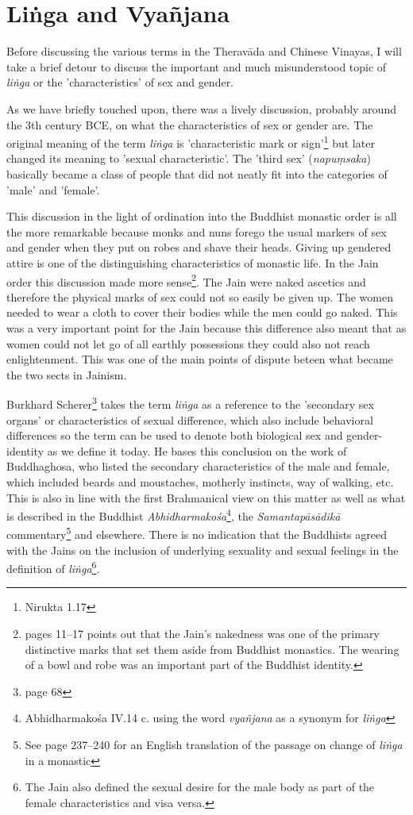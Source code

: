 \section{Liṅga and Vyañjana}
\label{linga}

Before discussing the various terms in the Theravāda and Chinese Vinayas, I will take a brief detour to discuss the important and much misunderstood topic of {\em liṅga} or the 'characteristics' of sex and gender.

As we have briefly touched upon, there was a lively discussion, probably around the 3th century BCE, on what the characteristics of sex or gender are. The original meaning of the term {\em liṅga} is 'characteristic mark or sign'\footnote{Nirukta 1.17} but later changed its meaning to 'sexual characteristic'. The 'third sex' ({\em napuṃsaka}) basically became a class of people that did not neatly fit into the categories of 'male' and 'female'. 

This discussion in the light of ordination into the Buddhist monastic order is all the more remarkable because monks and nuns forego the usual markers of sex and gender when they put on robes and shave their heads. Giving up gendered attire is one of the distinguishing characteristics of monastic life. In the Jain order this discussion made more sense\footnote{\cite{maes2016} pages 11–17 points out that the Jain's nakedness was one of the primary distinctive marks that set them aside from Buddhist monastics. The wearing of a bowl and robe was an important part of the Buddhist identity.}. The Jain were naked ascetics and therefore the physical marks of sex could not so easily be given up. The women needed to wear a cloth to cover their bodies while the men could go naked. This was a very important point for the Jain because this difference also meant that as women could not let go of all earthly possessions they could also not reach enlightenment. This was one of the main points of dispute beteen what became the two sects in Jainism.

Burkhard Scherer\footnote{\cite{scherer} page 68} takes the term {\em liṅga} as a reference to the 'secondary sex organs' or characteristics of sexual difference, which also include behavioral differences so the term can be used to denote both biological sex and gender-identity as we define it today. He bases this conclusion on the work of Buddhaghosa, who listed the secondary characteristics of the male and female, which included beards and moustaches, motherly instincts, way of walking, etc. This is also in line with the first Brahmanical view on this matter as well as what is described in the Buddhist {\em Abhidharmakośa}\footnote{Abhidharmakośa IV.14 c. using the word {\em vyañjana} as a synonym for {\em liṅga}}, the {\em Samantapāsādikā} commentary\footnote{See \cite{anderson2016} page 237–240 for an English translation of the passage on change of {\em liṅga} in a monastic} and elsewhere. There is no indication that the Buddhists agreed with the Jains on the inclusion of underlying sexuality and sexual feelings in the definition of {\em liṅga}\footnote{The Jain also defined the sexual desire for the male body as part of the female characteristics and visa versa.}.

